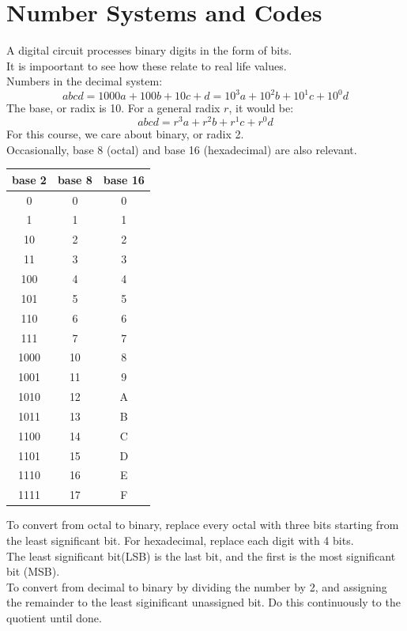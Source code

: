 \documentclass[nobib]{tufte-handout}
\begin{document}
\section{Number Systems and Codes}
A digital circuit processes binary digits in the form of bits.\\ It is
impoortant to see how these relate to real life values.\\ Numbers in the
decimal system:
\begin{equation*}
    abcd = 1000a+100b+10c+d = 10^3a+10^2b+10^1c+10^0d
\end{equation*}
The base, or radix is 10.
For a general radix $r$, it would be:
\begin{equation*}
    abcd = r^3a+r^2b+r^1c+r^0d
\end{equation*}
For this course, we care about binary, or radix 2.\\
Occasionally, base 8 (octal) and base 16 (hexadecimal) are also relevant.
\begin{table}
    \centering
    \begin{tabular}{c|c|c}
        base 2 & base 8 & base 16 \\
        \hline
        0      & 0      & 0       \\
        1      & 1      & 1       \\
        10     & 2      & 2       \\
        11     & 3      & 3       \\
        100    & 4      & 4       \\
        101    & 5      & 5       \\
        110    & 6      & 6       \\
        111    & 7      & 7       \\
        1000   & 10     & 8       \\
        1001   & 11     & 9       \\
        1010   & 12     & A       \\
        1011   & 13     & B       \\
        1100   & 14     & C       \\
        1101   & 15     & D       \\
        1110   & 16     & E       \\
        1111   & 17     & F       \\
    \end{tabular}
\end{table}
To convert from octal to binary, replace every octal with three bits starting from the least significant bit.  For hexadecimal, replace each digit with 4 bits.\\
The least significant bit(LSB) is the last bit, and the first is the most significant bit (MSB).\\
To convert from decimal to binary by dividing the number by 2, and assigning the remainder to the least siginificant unassigned bit. Do this continuously to the quotient until done.\\
\end{document}
